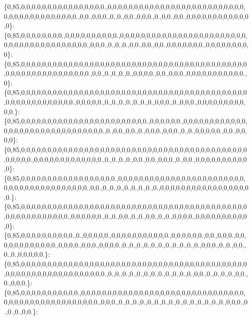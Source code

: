 \{0,85,0,0,0,0,0,0,0,0,0,0,0,0,0,0,0,0.,0,0,0,0,0,0,0,0,0,0,0,0,0,0,0,0,0,0,0,0,0,0,0,0,0,0,0,0,0,0,0,0,0,0,0,0,0,0,0,0.,0,0.,0,0,0.,0.,0.,0,0.,0,0,0.,0.,0,0.,0,0.,0,0,0,0,0,0,0,0,0,0,0,0,0\}\+: \{0,85,0,0,0,0,0,0,0,0.,0,0,0,0,0,0,0,0,0,0.,0,0,0,0,0,0,0,0,0,0,0,0,0,0,0,0,0,0,0,0,0,0,0,0,0,0,0,0,0,0,0,0,0,0,0,0,0,0,0,0.,0,0,0.,0.,0.,0.,0,0.,0,0.,0,0.,0,0,0,0,0,0,0.,0,0,0,0,0,0,0,0,0\}\+: \{0,85,0,0,0,0,0,0,0,0,0,0,0,0,0,0,0,0,0,0,0,0,0,0,0,0,0,0,0,0,0,0,0,0,0,0,0,0,0,0,0,0,0,0,0,0,0,0,0,0,0,0,0,0,0,0,0,0,0,0,0.,0,0.,0.,0.,0.,0.,0,0,0,0.,0,0.,0,0,0.,0,0,0,0,0,0,0,0,0,0,0.,0\}\+: \{0,85,0,0,0,0,0,0,0,0,0,0,0,0,0,0,0,0,0,0,0,0,0,0,0,0,0,0,0,0,0,0,0,0,0,0,0,0,0,0,0,0,0,0,0,0,0,0,0,0,0,0,0,0,0,0,0,0.,0,0,0,0,0.,0.,0.,0.,0.,0.,0.,0.,0,0,0.,0.,0,0,0.,0,0,0,0,0,0,0,0,0,0,0.\}\+: \{0,85,0,0,0,0,0,0,0,0,0,0,0,0,0,0,0,0,0,0,0,0,0,0,0,0.,0,0,0,0,0,0.,0,0,0,0,0,0,0,0,0,0,0,0,0,0,0,0,0,0,0,0,0,0,0,0,0,0,0,0,0,0,0.,0.,0,0.,0,0.,0.,0,0,0.,0,0,0.,0.,0.,0,0,0,0,0.,0,0.,0,0,0,0\}\+: \{0,85,0,0,0,0,0,0,0,0,0,0,0,0,0,0,0,0,0,0,0,0,0,0,0,0,0,0,0,0,0,0,0,0,0,0,0,0,0,0,0,0,0,0,0,0,0,0,0,0.,0,0,0,0,0,0,0,0,0,0,0,0,0.,0.,0.,0.,0.,0,0.,0,0.,0,0,0.,0.,0,0.,0,0,0,0,0,0,0,0,0,0,0\}\+: \{0,85,0,0,0,0,0,0,0,0,0,0,0,0,0,0,0,0,0,0.,0,0,0,0,0,0,0,0,0,0,0,0,0,0,0,0,0,0,0,0,0,0,0,0,0,0,0,0,0,0,0,0,0,0,0,0,0,0,0,0.,0,0.,0.,0.,0.,0.,0.,0.,0.,0.,0,0,0,0,0,0,0,0,0,0,0,0,0,0,0,0,0,0.\}\+: \{0,85,0,0,0,0,0,0,0,0,0,0,0,0,0,0,0,0,0,0,0,0,0,0,0,0,0,0,0,0,0,0,0,0,0,0,0,0,0,0,0,0,0,0,0,0,0,0,0,0,0,0,0,0,0,0,0.,0,0,0,0,0,0.,0.,0.,0,0.,0.,0.,0,0.,0.,0.,0,0,0,0.,0,0,0,0,0,0,0,0,0,0,0\}\+: \{0,85,0,0,0,0,0,0,0,0,0,0.,0.,0,0,0,0,0.,0,0,0,0,0,0,0,0,0,0,0.,0,0,0,0,0,0.,0,0.,0,0,0.,0,0,0,0,0,0,0,0,0,0,0,0.,0,0,0,0.,0,0,0.,0,0,0,0.,0.,0.,0.,0.,0.,0.,0.,0.,0.,0.,0.,0,0,0.,0.,0.,0,0.,0.,0.,0,0,0,0,0.\}\+: \{0,85,0,0,0,0,0,0,0,0,0,0,0,0,0,0,0,0,0,0,0,0,0,0,0,0,0,0,0,0,0,0,0,0,0,0,0,0,0,0,0,0,0,0,0,0,0,0,0,0,0,0,0,0,0,0,0,0,0,0,0,0,0,0.,0.,0.,0.,0.,0.,0.,0.,0.,0.,0.,0.,0.,0,0.,0.,0.,0.,0.,0,0.,0.,0,0,0.\}\+: \{0,85,0,0,0,0,0,0,0,0,0,0,0.,0,0,0,0,0,0,0,0,0,0,0,0,0,0,0,0,0,0,0,0,0,0,0,0,0,0,0,0,0,0,0,0,0,0,0,0,0,0,0,0,0,0,0,0,0,0,0,0,0.,0,0,0.,0.,0.,0.,0.,0.,0.,0.,0.,0.,0.,0.,0.,0.,0.,0.,0,0,0.,0.,0.,0.,0,0.\}\+: 